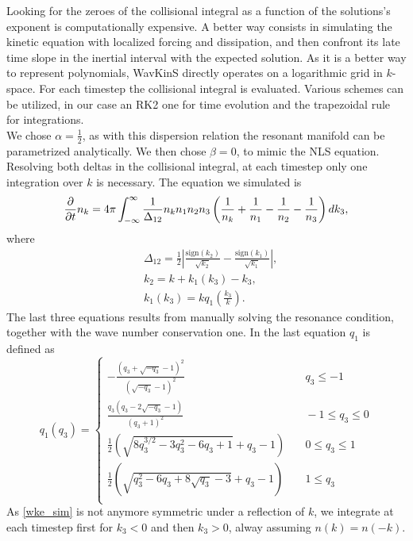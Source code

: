     Looking for the zeroes of the collisional integral as a function of the solutions's exponent is computationally expensive. A better way consists in simulating the kinetic equation with localized forcing and dissipation, and then confront its late time slope in the inertial interval with the expected solution. As it is a better way to represent polynomials, WavKinS directly operates on a logarithmic grid in $k$-space. For each timestep the collisional integral is evaluated. Various schemes can be utilized, in our case an RK2 one for time evolution and the trapezoidal rule for integrations.\\
    We chose $\alpha = \frac{1}{2}$, as with this dispersion relation the resonant manifold can be parametrized analytically.
    We then chose $\beta = 0$, to mimic the NLS equation. Resolving both deltas in the collisional integral, at each timestep only one integration over $k$ is necessary. The equation we simulated is
    \begin{equation}
        \frac{\partial}{\partial t} n_k=4\pi \int_{-\infty}^\infty\frac{1}{\Delta_{12}}n_kn_1n_2n_3\left(\frac{1}{n_k}+\frac{1}{n_1}-\frac{1}{n_2}-\frac{1}{n_3}   \right)dk_3,  
        \label{wke_sim} 
    \end{equation}     
    where 
    \begin{equation}
        \begin{aligned}
            &\Delta_{12}=\frac{1}{2}\left| \frac{\text{sign}{(k_2)}}{\sqrt{k_2}}- \frac{\text{sign}{(k_1)}}{\sqrt{k_1}}  \right|, \\
            &k_2=k+k_1(k_3)-k_3, \\
            &k_1(k_3)=k q_1\left(\frac{k_3}{k}\right).
        \end{aligned}
    \end{equation}
    The last three equations results from manually solving the resonance condition, together with the wave number conservation one. In the last equation $q_1$ is defined as 
    \begin{equation}
        q_1(q_3) = \left\{
        \begin{array}{ll}
            -\frac{\left(q_3+\sqrt{-q_3}-1\right)^2}{\left(\sqrt{-q_3}-1\right)^2} & \quad q_3 \leq -1 \\
            \frac{q_3 \left(q_3-2 \sqrt{-q_3}-1\right)}{(q_3+1)^2} & \quad -1 \leq q_3 \leq 0\\
            \frac{1}{2} \left(\sqrt{8 q_3^{3/2}-3 q_3^2-6 q_3+1}+q_3-1\right) & \quad 0 \leq q_3 \leq 1\\
            \frac{1}{2} \left(\sqrt{q_3^2-6 q_3+8 \sqrt{q_3}-3}+q_3-1\right) & \quad 1 \leq q_3\\
        \end{array}
    \right.
    \end{equation}
    As \eqref{wke_sim} is not anymore symmetric under a reflection of $k$, we integrate at each timestep first for $k_3 < 0$ and then $k_3 > 0$, alway assuming $n(k) = n(-k)$. \\

